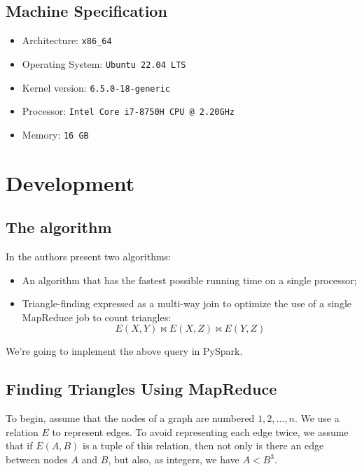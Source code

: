 \documentclass[a4paper,11pt, twoside]{article}
\begin{document}
        \subsection{Machine Specification}
        \begin{itemize}
            \item Architecture: \texttt{x86\_64}
            \item Operating System: \texttt{Ubuntu 22.04 LTS}
            \item Kernel version: \texttt{6.5.0-18-generic}
            \item Processor: \texttt{Intel Core\texttrademark\ i7-8750H CPU @ 2.20GHz}
            \item Memory: \texttt{16 GB}
        \end{itemize}
        
        
    \newpage
    \section{Development}\label{development}
    
    
       \subsection{The algorithm}
        In \cite{10.5555/2787930} the authors present two algorithms: 
         \begin{itemize}
             \item An algorithm that has the fastest possible running time on a single processor;
             \item Triangle-finding expressed as a multi-way join to optimize the use of a single MapReduce job to count triangles:
             $$ E(X,Y) \bowtie E(X,Z) \bowtie E(Y,Z) $$
         \end{itemize}
         We're going to implement the above query in PySpark.
    
        \subsection{Finding Triangles Using MapReduce}
        To begin, assume that the nodes of a graph are numbered $1, 2, \dots, n$. We use a relation $E$ to represent edges. To avoid representing each edge twice, we assume that if $E(A, B)$ is a tuple of this relation, then not only is there an edge between nodes $A$ and $B$, but also, as integers, we have $A < B^3$.
        
\end{document}
